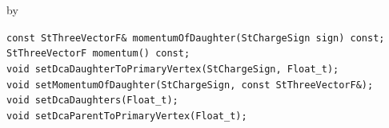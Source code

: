 \documentclass[twoside]{article}
\newcommand{\entrylabel}[1]{\mbox{\textbf{{#1}}}\hfil}%
\newenvironment{entry}
{\begin{list}{}%
    {\renewcommand{\makelabel}{\entrylabel}%
     \setlength{\labelwidth}{90pt}%
     \setlength{\leftmargin}{\labelwidth}
     \advance\leftmargin by \labelsep%
      }%
    }%
  {\end{list}}
\newcommand{\Entrylabel}[1]%
{\raisebox{0pt}[1ex][0pt]{\makebox[\labelwidth][l]%
    {\parbox[t]{\labelwidth}{\hspace{0pt}\textbf{{#1}}}}}}
\newenvironment{Entry}%
{\renewcommand{\entrylabel}{\Entrylabel}\begin{entry}}%
  {\end{entry}}
\begin{document}
\begin{Entry}
    \verb+const StThreeVectorF& momentumOfDaughter(StChargeSign sign) const;+\\

    \verb+StThreeVectorF momentum() const;+\\

    \verb+void setDcaDaughterToPrimaryVertex(StChargeSign, Float_t);+\\

    \verb+void setMomentumOfDaughter(StChargeSign, const StThreeVectorF&);+\\

    \verb+void setDcaDaughters(Float_t);+\\

    \verb+void setDcaParentToPrimaryVertex(Float_t);+\\
\end{Entry}
\clearpage
\end{document}

